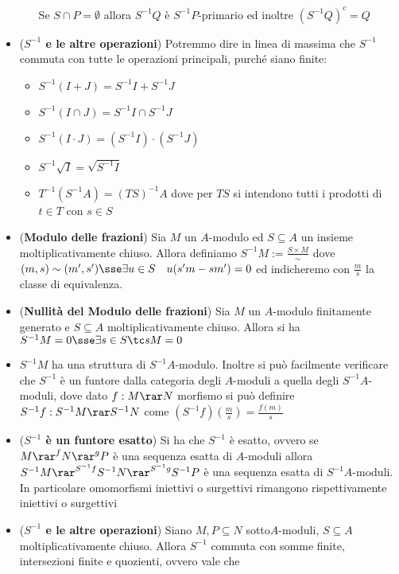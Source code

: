 \documentclass[a4paper,NoNotes,GeneralMath]{stdmdoc}
\begin{document}
\begin{itemize}
\begin{itemize}
					Se $S \cap P = \emptyset$ allora $S^{-1}Q$ è $S^{-1}P$-primario ed inoltre $(S^{-1}Q)^c = Q$
			\end{itemize}
		\item ({\bf $S^{-1}$ e le altre operazioni}) Potremmo dire in linea di massima che $S^{-1}$ commuta con tutte le operazioni principali, purché siano finite:
			\begin{itemize}
				\item $S^{-1}(I + J) = S^{-1}I + S^{-1}J$
				\item $S^{-1}(I \cap J) = S^{-1}I \cap S^{-1}J$
				\item $S^{-1}(I \cdot J) = (S^{-1}I) \cdot (S^{-1}J)$
				\item $S^{-1}\sqrt{I} = \sqrt{S^{-1}I}$
				\item $T^{-1}(S^{-1}A) = (TS)^{-1}A$ dove per $TS$ si intendono tutti i prodotti di $t \in T$ con $s \in S$
			\end{itemize}
		\item ({\bf Modulo delle frazioni}) Sia $M$ un $A$-modulo ed $S \subseteq A$ un insieme moltiplicativamente chiuso. Allora definiamo $S^{-1}M := \frac{S \times M}{\sim}$ dove $(m, s) \sim (m', s') \sse \exists u \in S \quad u (s'm - sm') = 0$ ed indicheremo con $\frac{m}{s}$ la classe di equivalenza. \\
		\item ({\bf Nullità del Modulo delle frazioni}) Sia $M$ un $A$-modulo finitamente generato e $S \subseteq A$ moltiplicativamente chiuso. Allora si ha $S^{-1}M = 0 \sse \exists s \in S \tc sM = 0$
		\item $S^{-1}M$ ha una struttura di $S^{-1}A$-modulo. Inoltre si può facilmente verificare che $S^{-1}$ è un funtore dalla categoria degli $A$-moduli a quella degli $S^{-1}A$-moduli, dove dato $f: M \rar N$ morfismo si può definire $S^{-1}f: S^{-1}M \rar S^{-1}N$ come $(S^{-1}f) (\frac{m}{s}) = \frac{f(m)}{s}$
		\item ({\bf $S^{-1}$ è un funtore esatto}) Si ha che $S^{-1}$ è esatto, ovvero se $M \rar^f N \rar^g P$ è una sequenza esatta di $A$-moduli allora $S^{-1}M \rar^{S^{-1}f} S^{-1}N \rar^{S^{-1}g} S^{-1}P$ è una sequenza esatta di $S^{-1}A$-moduli. \\
		In particolare omomorfismi iniettivi o surgettivi rimangono rispettivamente iniettivi o surgettivi
		\item ({\bf $S^{-1}$ e le altre operazioni}) Siano $M, P \subseteq N$ sotto$A$-moduli, $S \subseteq A$ moltiplicativamente chiuso. Allora $S^{-1}$ commuta con somme finite, intersezioni finite e quozienti, ovvero vale che

\end{itemize}
\end{document}
